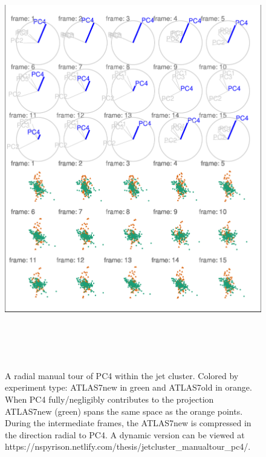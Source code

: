 \begin{Schunk}
\begin{figure}

{\centering \includegraphics[width=6in,height=7.2in]{spinifex_paper_files/figure-latex/JetClusterGood-1} 

}

\caption[A radial manual tour of PC4 within the jet cluster]{A radial manual tour of PC4 within the jet cluster. Colored by experiment type: ATLAS7new in green and ATLAS7old in orange. When PC4 fully/negligibly contributes to the projection ATLAS7new (green) spans the same space as the orange points. During the intermediate frames, the ATLAS7new is compressed in the direction radial to PC4. A dynamic version can be viewed at https://nspyrison.netlify.com/thesis/jetcluster\_manualtour\_pc4/.}\label{fig:JetClusterGood}
\end{figure}
\end{Schunk}

